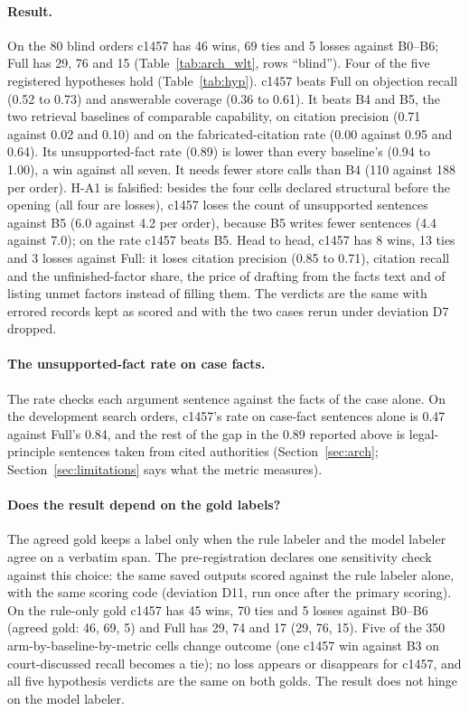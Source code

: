 \paragraph{Result.} On the 80 blind orders c1457 has 46 wins, 69 ties and 5 losses against B0--B6; Full has 29, 76 and 15 (Table~\ref{tab:arch_wlt}, rows ``blind''). Four of the five registered hypotheses hold (Table~\ref{tab:hyp}). c1457 beats Full on objection recall (0.52 to 0.73) and answerable coverage (0.36 to 0.61). It beats B4 and B5, the two retrieval baselines of comparable capability, on citation precision (0.71 against 0.02 and 0.10) and on the fabricated-citation rate (0.00 against 0.95 and 0.64). Its unsupported-fact rate (0.89) is lower than every baseline's (0.94 to 1.00), a win against all seven. It needs fewer store calls than B4 (110 against 188 per order). H-A1 is falsified: besides the four cells declared structural before the opening (all four are losses), c1457 loses the count of unsupported sentences against B5 (6.0 against 4.2 per order), because B5 writes fewer sentences (4.4 against 7.0); on the rate c1457 beats B5. Head to head, c1457 has 8 wins, 13 ties and 3 losses against Full: it loses citation precision (0.85 to 0.71), citation recall and the unfinished-factor share, the price of drafting from the facts text and of listing unmet factors instead of filling them. The verdicts are the same with errored records kept as scored and with the two cases rerun under deviation D7 dropped.

\paragraph{The unsupported-fact rate on case facts.} The rate checks each argument sentence against the facts of the case alone. On the development search orders, c1457's rate on case-fact sentences alone is 0.47 against Full's 0.84, and the rest of the gap in the 0.89 reported above is legal-principle sentences taken from cited authorities (Section~\ref{sec:arch}; Section~\ref{sec:limitations} says what the metric measures).

\paragraph{Does the result depend on the gold labels?} The agreed gold keeps a label only when the rule labeler and the model labeler agree on a verbatim span. The pre-registration declares one sensitivity check against this choice: the same saved outputs scored against the rule labeler alone, with the same scoring code (deviation D11, run once after the primary scoring). On the rule-only gold c1457 has 45 wins, 70 ties and 5 losses against B0--B6 (agreed gold: 46, 69, 5) and Full has 29, 74 and 17 (29, 76, 15). Five of the 350 arm-by-baseline-by-metric cells change outcome (one c1457 win against B3 on court-discussed recall becomes a tie); no loss appears or disappears for c1457, and all five hypothesis verdicts are the same on both golds. The result does not hinge on the model labeler.

